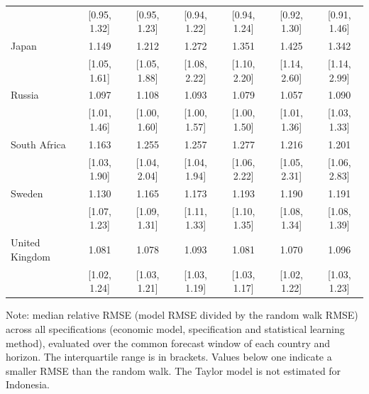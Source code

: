 \begin{table}[htbp]
{\begin{tabular*}{\textwidth}{@{\extracolsep{\fill}}lcccccc}
 & [0.95, 1.32] & [0.95, 1.23] & [0.94, 1.22] & [0.94, 1.24] & [0.92, 1.30] & [0.91, 1.46] \\
\addlinespace
Japan & 1.149 & 1.212 & 1.272 & 1.351 & 1.425 & 1.342 \\
 & [1.05, 1.61] & [1.05, 1.88] & [1.08, 2.22] & [1.10, 2.20] & [1.14, 2.60] & [1.14, 2.99] \\
\addlinespace
Russia & 1.097 & 1.108 & 1.093 & 1.079 & 1.057 & 1.090 \\
 & [1.01, 1.46] & [1.00, 1.60] & [1.00, 1.57] & [1.00, 1.50] & [1.01, 1.36] & [1.03, 1.33] \\
\addlinespace
South Africa & 1.163 & 1.255 & 1.257 & 1.277 & 1.216 & 1.201 \\
 & [1.03, 1.90] & [1.04, 2.04] & [1.04, 1.94] & [1.06, 2.22] & [1.05, 2.31] & [1.06, 2.83] \\
\addlinespace
Sweden & 1.130 & 1.165 & 1.173 & 1.193 & 1.190 & 1.191 \\
 & [1.07, 1.23] & [1.09, 1.31] & [1.11, 1.33] & [1.10, 1.35] & [1.08, 1.34] & [1.08, 1.39] \\
\addlinespace
United Kingdom & 1.081 & 1.078 & 1.093 & 1.081 & 1.070 & 1.096 \\
 & [1.02, 1.24] & [1.03, 1.21] & [1.03, 1.19] & [1.03, 1.17] & [1.02, 1.22] & [1.03, 1.23] \\
\bottomrule
\end{tabular*}
}
\par\noindent\begin{minipage}{\textwidth}
{\fontsize{8}{10}\selectfont Note: median relative RMSE (model RMSE divided by the random walk RMSE) across all specifications (economic model, specification and statistical learning method), evaluated over the common forecast window of each country and horizon. The interquartile range is in brackets. Values below one indicate a smaller RMSE than the random walk. The Taylor model is not estimated for Indonesia.}
\end{minipage}
\end{table}
